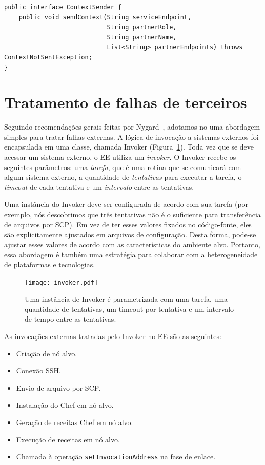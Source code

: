 \begin{description}
\begin{lstlisting}[frame=trbl, label=lst:context_sender, caption=Interface ContextSender.]
public interface ContextSender {
    public void sendContext(String serviceEndpoint, 
                            String partnerRole, 
                            String partnerName, 
                            List<String> partnerEndpoints) throws ContextNotSentException;
}
\end{lstlisting}

\end{description}

\section{Tratamento de falhas de terceiros}
\label{sec:falhas}

Seguindo recomendações gerais feitas por Nygard~\cite{Nygard2009Release},
adotamos no \ee uma abordagem simples para tratar falhas externas.
A lógica de invocação a sistemas externos foi encapsulada em uma classe, 
chamada \textsf{Invoker} (Figura~\ref{fig:invoker}).
Toda vez que se deve acessar um sistema externo, o EE utiliza um \emph{invoker}.
O \textsf{Invoker} recebe os seguintes parâmetros:
uma \emph{tarefa}, que é uma rotina que se comunicará com algum sistema externo,
a quantidade de \emph{tentativas} para executar a tarefa,
o \emph{timeout} de cada tentativa e um \emph{intervalo} entre as tentativas.

Uma instância do \textsf{Invoker} deve ser configurada 
de acordo com sua tarefa (por exemplo, nós descobrimos que três tentativas
não é o suficiente para transferência de arquivos por SCP).
Em vez de ter esses valores fixados no código-fonte, eles são explicitamente
ajustados em arquivos de configuração.
Desta forma, pode-se ajustar esses valores de acordo com 
as características do ambiente alvo.
Portanto, essa abordagem é também uma estratégia para colaborar 
com a heterogeneidade de plataformas e tecnologias.

\begin{figure}[ht]
\centering
\texttt{[image: invoker.pdf]}
\caption{Uma instância de \textsf{Invoker} é parametrizada com uma tarefa, uma quantidade de tentativas, um timeout por tentativa e um intervalo de tempo entre as tentativas.}
\label{fig:invoker}
\end{figure}

As invocações externas tratadas pelo \textsf{Invoker} no EE são as seguintes:

\begin{itemize}
\item Criação de nó alvo.
\item Conexão SSH.
\item Envio de arquivo por SCP.
\item Instalação do Chef em nó alvo. 
\item Geração de receitas Chef em nó alvo.
\item Execução de receitas em nó alvo.
\item Chamada à operação \texttt{setInvocationAddress} na fase de enlace.
\end{itemize}

